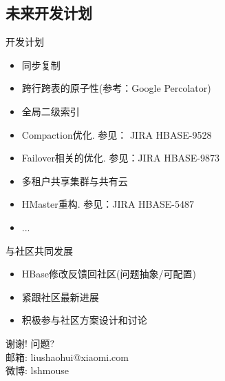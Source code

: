 \documentclass[xcolor=table]{beamer}
\begin{document}
\begin{CJK}{UTF8}{gkai}
\section{未来开发计划}
\begin{frame}{开发计划}
\begin{itemize}
	\item 同步复制
	\item 跨行跨表的原子性(参考：Google Percolator)
	\item 全局二级索引
	\item Compaction优化. 参见： JIRA HBASE-9528
	\item Failover相关的优化. 参见：JIRA HBASE-9873
	\item 多租户共享集群与共有云
	\item HMaster重构. 参见：JIRA HBASE-5487
	\item ...
\end{itemize}
\end{frame}

\begin{frame}{与社区共同发展}
\begin{itemize}
	\item HBase修改反馈回社区(问题抽象/可配置)
	\item 紧跟社区最新进展 
	\item 积极参与社区方案设计和讨论 
\end{itemize}
\end{frame}

\begin{frame}[plain,c]
	\begin{center}
		\Huge 谢谢! 问题? \\
		\bigskip
		\bigskip
		\large
		邮箱: liushaohui@xiaomi.com\\ 
		微博: lshmouse
	\end{center}
\end{frame}

\end{CJK}
\end{document}
